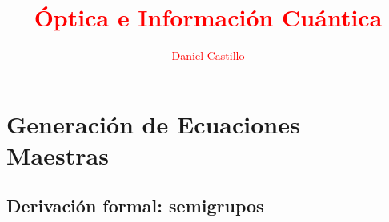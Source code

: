 \documentclass{book}
\begin{document}
\author{\textcolor{Red}{Daniel Castillo}}
\title{\textcolor{Red}{Óptica e Información Cuántica}}
\vspace{0.05in}
\chapterfont{\color{Red}}
\sectionfont{\color{Red}}
\subsectionfont{\color{Red}}
\everymath{\color{blue}}
\everydisplay{\color{blue}}
\maketitle
\tableofcontents
\chapter{Generación de Ecuaciones Maestras}

\section{Derivación formal: semigrupos}
\end{document}
